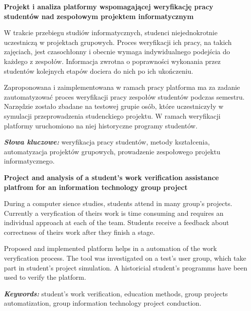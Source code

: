 \newpage
\vspace{10cm}

\newpage
\begin{center}
	\textbf{Projekt i analiza platformy wspomagającej weryfikację pracy studentów
nad zespołowym projektem informatycznym}
\end{center}

W trakcie przebiegu studiów informatycznych, studenci niejednokrotnie uczestniczą w projektach grupowych.
Proces weryfikacji ich pracy, na takich zajęciach, jest czasochłonny i obecnie wymaga indywidualnego podejścia do każdego z zespołów.
Informacja zwrotna o poprawności wykonania przez studentów kolejnych etapów dociera do nich po ich ukończeniu.

Zaproponowana i zaimplementowana w ramach pracy platforma ma za zadanie zautomatyzować proces weryfikacji pracy zespołów studentów podczas semestru. 
Narzędzie zostało zbadane na testowej grupie osób, które uczestniczyły w symulacji przeprowadzenia studenckiego projektu.
W ramach weryfikacji platformy uruchomiono na niej historyczne programy studentów.


\textit{\textbf{Słowa kluczowe:}} weryfikacja pracy studentów, metody kształcenia, automatyzacja projektów grupowych, prowadzenie zespołowego projektu informatycznego.

	\vspace{1cm}

\begin{center}
    \textbf{Project and analysis of a student's work verification assistance platfrom for an information technology group project}
\end{center}

During a computer sience studies, students attend in many group's projects.
Currently a veryfication of theirs work is time consuming and requires an individual approach at each of the team.
Students receive a feedback about correctness of theirs work after they finish a stage.

Proposed and implemented platform helps in a automation of the work veryfication process.
The tool was investigated on a test's user group, which take part in student's project simulation.
A historicial student's programms have been used to verify the platform.

\textit{\textbf{Keywords:}} student's work verification, education methods, group projects automatization, group information technology project conduction.

\cleardoublepage

